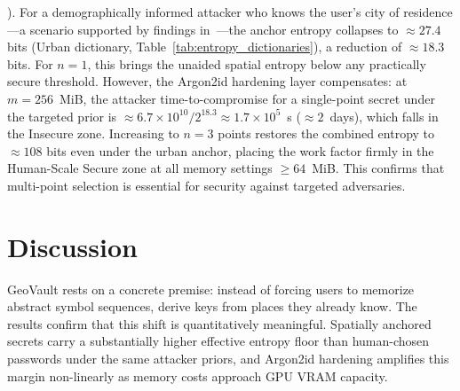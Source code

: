 \documentclass[mathematics,article,accept,pdftex,moreauthors]{Definitions/mdpi}
\begin{document}
{). For a demographically informed attacker who knows the user's city of residence---a scenario supported by findings in~\cite{Sun2012, Thorpe2013, AlAmeen2014}---the anchor entropy collapses to $\approx$$27.4$ bits (Urban dictionary, Table~\ref{tab:entropy_dictionaries}), a reduction of $\approx$$18.3$ bits. For $n=1$, this brings the unaided spatial entropy below any practically secure threshold. However, the Argon2id hardening layer compensates: at $m = 256$~MiB, the attacker time-to-compromise for a single-point secret under the targeted prior is $\approx$$6.7 \times 10^{10} / 2^{18.3} \approx 1.7 \times 10^{5}$~s ($\approx$$2$~days), which falls in the Insecure zone. Increasing to $n = 3$ points restores the combined entropy to $\approx$$108$ bits even under the urban anchor, placing the work factor firmly in the Human-Scale Secure zone at all memory settings $\ge$$64$~MiB. This confirms that multi-point selection is essential for security against targeted adversaries.}



\section{Discussion\label{sec6}}

{GeoVault rests on a concrete premise: instead of forcing users to memorize abstract symbol sequences, derive keys from places they already know. The results confirm that this shift is quantitatively meaningful. Spatially anchored secrets carry a substantially higher effective entropy floor than human-chosen passwords under the same attacker priors, and Argon2id hardening amplifies this margin non-linearly as memory costs approach GPU VRAM capacity.}
\end{document}
